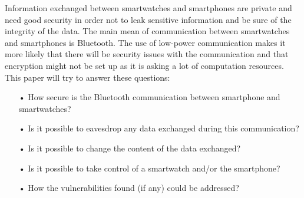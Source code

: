 Information exchanged between smartwatches and smartphones are private and need good security in order not to leak sensitive information and be sure of the integrity of the data. 
The main mean of communication between smartwatches and smartphones is Bluetooth.
The use of low-power communication makes it more likely that there will be security issues with the communication and that encryption might not be set up as it is asking a lot of computation resources. 
This paper will try to answer these questions:
\begin{itemize}
\item[•] How secure is the Bluetooth communication between smartphone and smartwatches?
\item[•]Is it possible to eavesdrop any data exchanged during this communication?
\item[•]Is it possible to change the content of the data exchanged?
\item[•]Is it possible to take control of a smartwatch and/or the smartphone?
\item[•]How the vulnerabilities found (if any) could be addressed?
\end{itemize}

